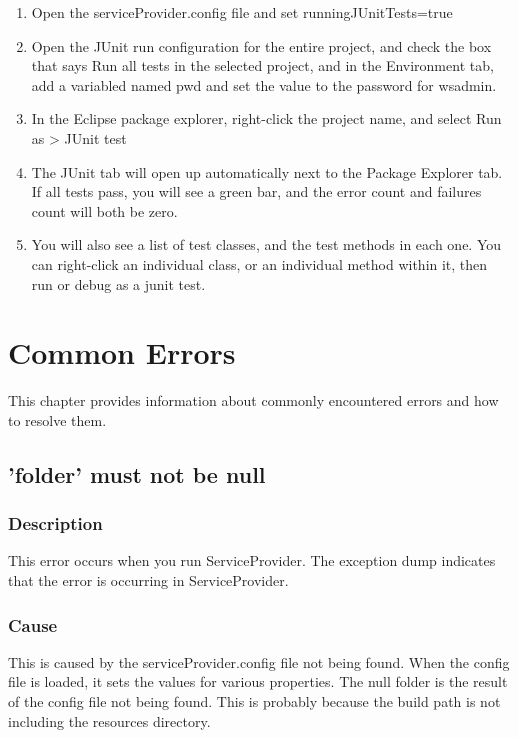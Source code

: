 \documentclass[]{memoir}
\begin{document}
\begin{enumerate}
    \item{Open the serviceProvider.config file and set runningJUnitTests=true}
    \item{Open the JUnit run configuration for the entire project, and check the box that says Run all tests in the selected project, and in the Environment tab, add a variabled named pwd and set the value to the password for wsadmin.}
    \item{In the Eclipse package explorer, right-click the project name, and select Run as > JUnit test}
    \item The JUnit tab will open up automatically next to the Package Explorer tab.  If all tests pass, you will see a green bar, and the error count and failures count will both be zero.
    \item You will also see a list of test classes, and the test methods in each one.  You can right-click an individual class, or an individual method within it, then run or debug as a junit test.
\end{enumerate}

\chapter{Common Errors}

This chapter provides information about commonly encountered errors and how to resolve them.

\section{'folder' must not be null}

\subsection{Description}
This error occurs when you run ServiceProvider.  The exception dump indicates that the error is occurring in ServiceProvider.

\subsection{Cause}

This is caused by the serviceProvider.config file not being found.  When the config file is loaded, it sets the values for various properties.  The null folder is the result of the config file not being found.  This is probably because the build path is not including the resources directory.
\end{document}
